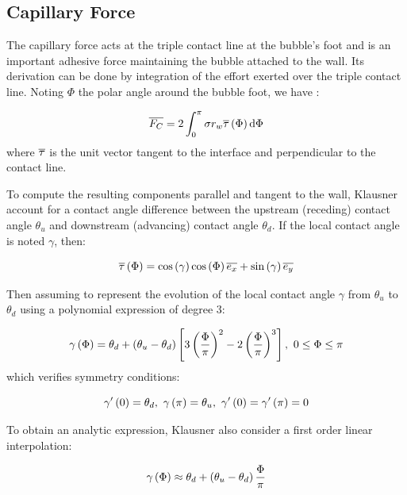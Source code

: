 \subsection{Capillary Force}

The capillary force acts at the triple contact line at the bubble's foot and is an important adhesive force maintaining the bubble attached to the wall. Its derivation can be done by integration of the effort exerted over the triple contact line. Noting $\Phi$ the polar angle around the bubble foot, we have :


\begin{equation}
\overline{F_{C}} = 2 \int_{0}^{\pi} \sigma r_{w} \overline{\tau}\left( \Phi \right) \mathrm{d}\Phi
\end{equation}
where $\overline{\tau}$ is the unit vector tangent to the interface and perpendicular to the contact line.

To compute the resulting components parallel and tangent to the wall, Klausner \etal \cite{klausner_vapor_1993} account for a contact angle difference between the upstream (receding) contact angle $\theta_{u}$ and downstream (advancing) contact angle $\theta_{d}$. If the local contact angle is noted $\gamma$, then:

\begin{equation}
\overline{\tau}\left( \Phi \right) = \mathrm{cos}\left( \gamma \right) \mathrm{cos}\left( \Phi \right) \overline{e_{x}} + \mathrm{sin}\left( \gamma \right) \overline{e_{y}}
\end{equation}

Then assuming to represent the evolution of the local contact angle $\gamma$ from $\theta_{u}$ to $\theta_{d}$ using a polynomial expression of degree 3:


\begin{equation}
\gamma\left( \Phi \right) = \theta_{d} + \left( \theta_{u} - \theta_{d} \right) \left[ 3\left( \frac{\Phi}{ \pi} \right)^{2} - 2\left( \frac{\Phi}{\pi} \right)^{3} \right],\ 0 \leq \Phi \leq \pi
\label{eq:forces_klausner_poly_deg3}
\end{equation}
which verifies symmetry conditions:

\begin{equation}
\gamma'\parth{0} = \theta_{d},\ \gamma\parth{\pi} = \theta_{u},\ \gamma'\parth{0}=\gamma'\parth{\pi}=0
\end{equation}

To obtain an analytic expression, Klausner \etal also consider a first order linear interpolation:

\begin{equation}
\gamma\left( \Phi \right) \approx \theta_{d} + \left( \theta_{u}-\theta_{d} \right)\frac{\Phi}{\pi}
\end{equation}

